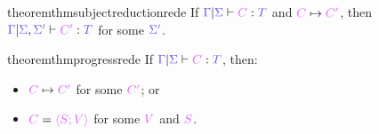 \documentclass[main.tex]{subfiles}
\begin{document}
\begin{restatable}{theorem}{thmsubjectreductionrede}
  \label{thm:subject-reduction-rede}
  If $\seq{\ty{\Gamma}}{\ty{\Sigma}}{C}{T}$ and $\tm{C}\rede\tm{C'}$, then $\seq{\ty{\Gamma}}{\ty{\Sigma},\ty{\Sigma'}}{C'}{T}$ for some $\ty{\Sigma'}$.
\end{restatable}

\begin{restatable}{theorem}{thmprogressrede}
  \label{thm:progress}
  If $\seq{\ty{\Gamma}}{\ty{\Sigma}}{C}{T}$, then:
  \begin{itemize}
  \item $\tm{C}\rede\tm{C'}$ for some $\tm{C'}$; or
  \item $\tm{C}=\tm{\config{V}{S}}$ for some $\tm{V}$ and $\tm{S}$.
  \end{itemize}
\end{restatable}

\begin{corollary}
\end{corollary}

\begin{corollary}
\end{corollary}
\end{document}
